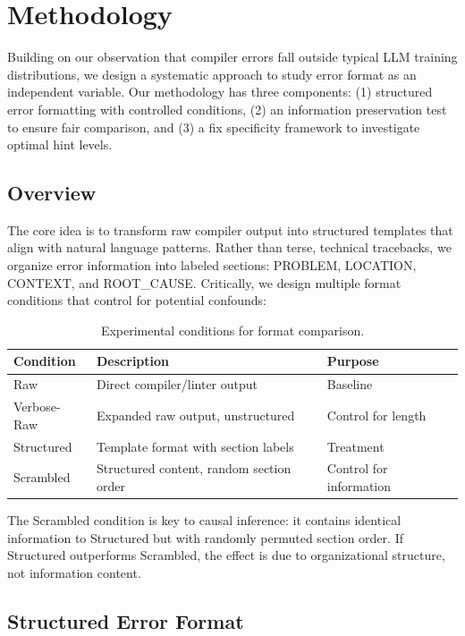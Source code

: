 \section{Methodology}

Building on our observation that compiler errors fall outside typical LLM training distributions, we design a systematic approach to study error format as an independent variable. Our methodology has three components: (1) structured error formatting with controlled conditions, (2) an information preservation test to ensure fair comparison, and (3) a fix specificity framework to investigate optimal hint levels.

\subsection{Overview}

The core idea is to transform raw compiler output into structured templates that align with natural language patterns. Rather than terse, technical tracebacks, we organize error information into labeled sections: PROBLEM, LOCATION, CONTEXT, and ROOT\_CAUSE. Critically, we design multiple format conditions that control for potential confounds:

\begin{table}[H]
\centering
\begin{tabular}{@{}lll@{}}
\toprule
\textbf{Condition} & \textbf{Description} & \textbf{Purpose} \\
\midrule
Raw & Direct compiler/linter output & Baseline \\
Verbose-Raw & Expanded raw output, unstructured & Control for length \\
Structured & Template format with section labels & Treatment \\
Scrambled & Structured content, random section order & Control for information \\
\bottomrule
\end{tabular}
\caption{Experimental conditions for format comparison.}
\end{table}

The Scrambled condition is key to causal inference: it contains identical information to Structured but with randomly permuted section order. If Structured outperforms Scrambled, the effect is due to organizational structure, not information content.

\subsection{Structured Error Format}

